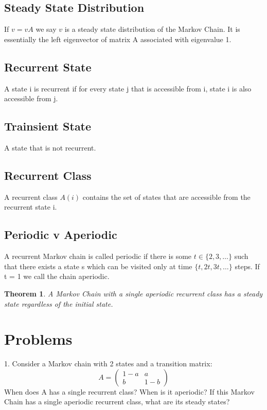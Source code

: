 \documentclass[11pt]{article}
\newtheorem{theorem}{Theorem}
\begin{document}
\subsection{Steady State Distribution}
If $v = vA$ we say $v$ is a steady state distribution of the Markov Chain.
It is essentially the left eigenvector of matrix A associated with eigenvalue 1.

\subsection{Recurrent State}
A state i is recurrent if for every state j that is accessible from i, state i is also accessible from j.

\subsection{Trainsient State}
A state that is not recurrent.

\subsection{Recurrent Class}
A recurrent class $A(i)$ contains the set of states that are accessible from the recurrent state i.

\subsection{Periodic v Aperiodic}
A recurrent Markov chain is called periodic if there is some $t \in \{2,3,\ldots\}$ such that there exists a state s which can be visited only at time $\{t,2t,3t,\ldots\}$ steps.
If t = 1 we call the chain aperiodic.

\begin{theorem}
A Markov Chain with a single aperiodic recurrent class has a steady state regardless of the initial state.
\end{theorem}

\section{Problems}
1. Consider a Markov chain with 2 states and a transition matrix:
$$A = \begin{pmatrix}
  1 - a & a \\
  b & 1 - b
\end{pmatrix}$$
When does A has a single recurrent class? When is it aperiodic?
If this Markov Chain has a single aperiodic recurrent class, what are its steady states?
\end{document}
